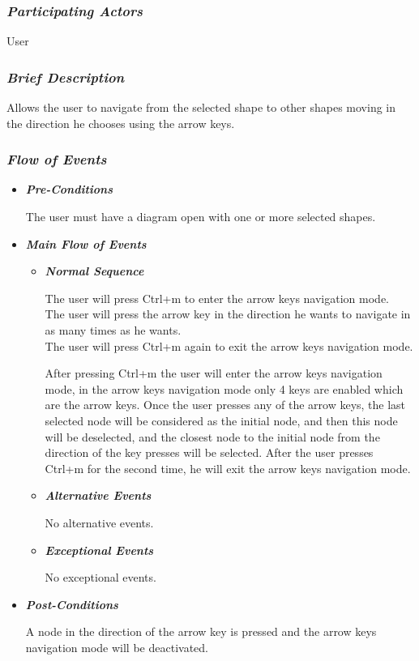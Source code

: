\subsubsection {\em Participating Actors}
User

\subsubsection {\em Brief Description}
Allows the user to navigate from the selected shape to other shapes moving in the direction he chooses using the arrow keys.

\subsubsection {\em Flow of Events}
\begin{itemize}

\item {\bf \em Pre-Conditions}
\par \noindent
The user must have a diagram open with one or more selected shapes.

\item {\bf \em Main Flow of Events}

\begin{itemize}

\item {\bf \em Normal Sequence}
\par \noindent
The user will press Ctrl+m to enter the arrow keys navigation mode.\\
The user will press the arrow key in the direction he wants to navigate in as many times as he wants.\\
The user will press Ctrl+m again to exit the arrow keys navigation mode.

\par \noindent
After pressing Ctrl+m the user will enter the arrow keys navigation mode, in the arrow keys navigation mode only 4 keys are enabled which are the arrow keys. Once the user presses any of the arrow keys, the last selected node will be considered as the initial node, and then this node will be deselected, and the closest node to the initial node from the direction of the key presses will be selected. After the user presses Ctrl+m for the second time, he will exit the arrow keys navigation mode.

\item {\bf \em Alternative Events}
\par \noindent
No alternative events.

\item {\bf \em Exceptional Events}
\par \noindent
No exceptional events.

\end{itemize}

\item {\bf \em Post-Conditions}
\par \noindent
A node in the direction of the arrow key is pressed and the arrow keys navigation mode will be deactivated.

\end{itemize}


